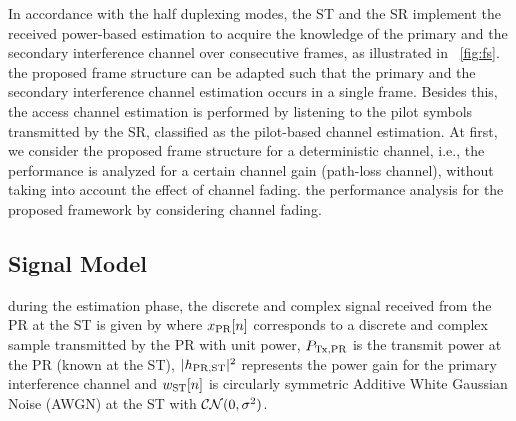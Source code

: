 In accordance with the half duplexing modes, the ST and the SR implement the received power-based estimation to acquire the knowledge of the primary and the secondary interference channel over consecutive frames, as illustrated in \figurename~\ref{fig:fs}.  the proposed frame structure can be adapted such that the primary and the secondary interference channel estimation occurs in a single frame. Besides this, the access channel estimation is performed by listening to the pilot symbols transmitted by the SR, classified as the pilot-based channel estimation. %
At first, we consider the proposed frame structure for a deterministic channel, i.e., the performance is analyzed for a certain channel gain (path-loss channel), without taking into account the effect of channel fading.  the performance analysis for the proposed framework by considering channel fading. %




\subsection{Signal Model}
 during the estimation phase, the discrete and complex signal received from the PR at the ST is given by
\tc{\begin{equation}
\yrcvd[n] = \gpo \cdot \sqrt{\ptran} \cdot \xtran[n] + \nas[n],
\label{eq:sys_mod_st}
\end{equation}}
where $x_{\text{PR}}[n]$ corresponds to a discrete and complex sample transmitted by the PR with unit power, $P_{\text{Tx,PR}}$ is the transmit power at the PR (known at the ST), $|h_{\text{PR,ST}}|^2$ represents the power gain for the primary interference channel and $w_{\text{ST}}[n]$ is circularly symmetric Additive White Gaussian Noise (AWGN) at the ST with %
$\mathcal{CN}(0, \sigma^2)$. %

